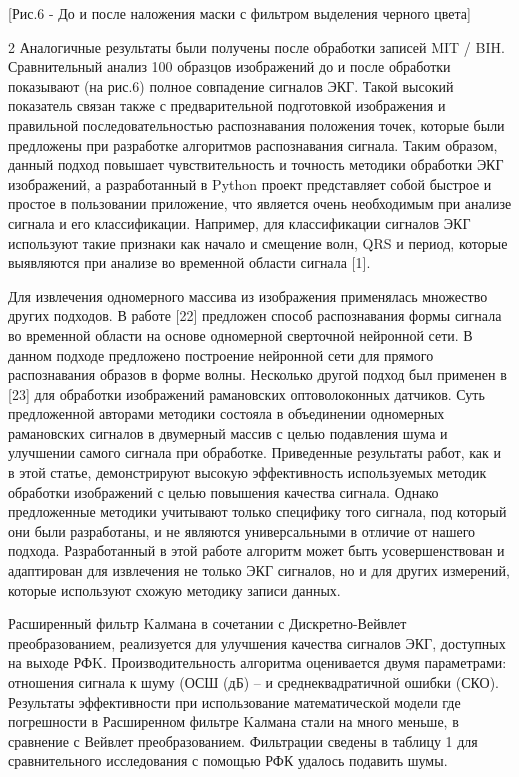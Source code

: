 [Рис.6 - До и после наложения маски с фильтром выделения
черного цвета]

\begin{multicols}{2}
Аналогичные результаты были получены после обработки записей MIT / BIH.
Сравнительный анализ 100 образцов изображений до и после обработки
показывают (на рис.6) полное совпадение сигналов ЭКГ. Такой высокий
показатель связан также с предварительной подготовкой изображения и
правильной последовательностью распознавания положения точек, которые
были предложены при разработке алгоритмов распознавания сигнала. Таким
образом, данный подход повышает чувствительность и точность методики
обработки ЭКГ изображений, а разработанный в Python проект представляет
собой быстрое и простое в пользовании приложение, что является очень
необходимым при анализе сигнала и его классификации. Например, для
классификации сигналов ЭКГ используют такие признаки как начало и
смещение волн, QRS и период, которые выявляются при анализе во временной
области сигнала {[}1{]}.

Для извлечения одномерного массива из изображения применялась множество
других подходов. В работе {[}22{]} предложен способ распознавания формы
сигнала во временной области на основе одномерной сверточной нейронной
сети. В данном подходе предложено построение нейронной сети для прямого
распознавания образов в форме волны. Несколько другой подход был
применен в {[}23{]} для обработки изображений рамановских оптоволоконных
датчиков. Суть предложенной авторами методики состояла в объединении
одномерных рамановских сигналов в двумерный массив с целью подавления
шума и улучшении самого сигнала при обработке. Приведенные результаты
работ, как и в этой статье, демонстрируют высокую эффективность
используемых методик обработки изображений с целью повышения качества
сигнала. Однако предложенные методики учитывают только специфику того
сигнала, под который они были разработаны, и не являются универсальными
в отличие от нашего подхода. Разработанный в этой работе алгоритм может
быть усовершенствован и адаптирован для извлечения не только ЭКГ
сигналов, но и для других измерений, которые используют схожую методику
записи данных.

Расширенный фильтр Kалмана в сочетании с Дискретно-Вейвлет
преобразованием, реализуется для улучшения качества сигналов ЭКГ,
доступных на выходе РФK. Производительность алгоритма оценивается двумя
параметрами: отношения сигнала к шуму (ОСШ (дБ) -- и среднеквадратичной
ошибки (СКО). Результаты эффективности при использование математической
модели где погрешности в Расширенном фильтре Kалмана стали на много
меньше, в сравнение с Вейвлет преобразованием. Фильтрации сведены в
таблицу 1 для сравнительного исследования с помощью РФК удалось подавить
шумы.
\end{multicols}

